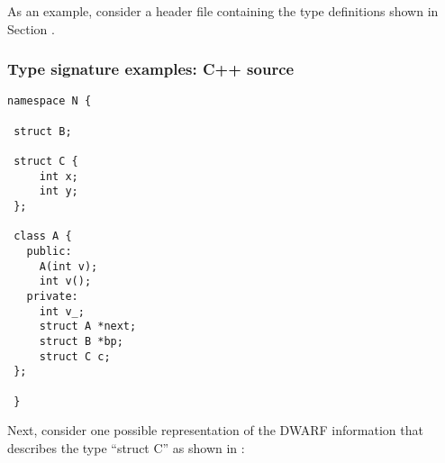 As an example, consider a  header file 
containing the type definitions shown
in Section .

\subsubsection{ Type signature examples: C++ source}
\label{app:typesignatureexamplescsource}
\begin{lstlisting}
namespace N {

 struct B;

 struct C {
     int x;
     int y;
 };

 class A {
   public:
     A(int v);
     int v();
   private:
     int v_;
     struct A *next;
     struct B *bp;
     struct C c;
 };

 }
\end{lstlisting}

Next, consider one possible representation of the DWARF
information that describes the type “struct C” as shown
in 
:

